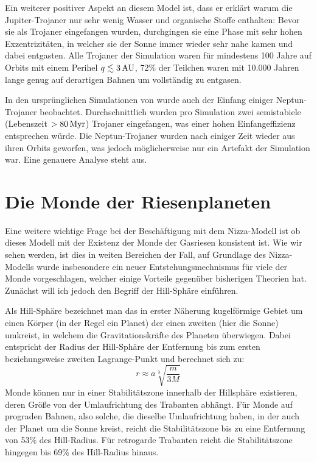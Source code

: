 \documentclass[12pt,a4paper,twoside]{article}
\renewcommand{\cite}{\citep}
\begin{document}
Ein weiterer positiver Aspekt an diesem Model ist, dass er erklärt warum die Jupiter-Trojaner nur sehr wenig Wasser und organische Stoffe enthalten\cite{Emery2004}:
Bevor sie als Trojaner eingefangen wurden, durchgingen sie eine Phase mit sehr hohen Exzentrizitäten, in welcher sie der Sonne immer wieder sehr nahe kamen und dabei entgasten.
Alle Trojaner der Simulation waren für mindestens 100 Jahre auf Orbits mit einem Perihel $q\lesssim \unit[3]{AU}$, 72\% der Teilchen waren mit 10.000 Jahren lange genug auf derartigen Bahnen um vollständig zu entgasen\cite{Levison1997,Morbidelli2005}.

In den ursprünglichen Simulationen von \cite{Tsiganis2005} wurde auch der Einfang einiger Neptun-Trojaner beobachtet. Durchschnittlich wurden pro Simulation zwei semistabiele (Lebenszeit $>\unit[80]{Myr}$) Trojaner eingefangen, was einer hohen Einfangeffizienz entsprechen würde\cite{Tsiganis2005}.
Die Neptun-Trojaner wurden nach einiger Zeit wieder aus ihren Orbits geworfen, was jedoch möglicherweise nur ein Artefakt der Simulation war\cite{Tsiganis2005}. %
Eine genauere Analyse steht aus. %

\FloatBarrier
\section{Die Monde der Riesenplaneten}\label{Monde}
Eine weitere wichtige Frage bei der Beschäftigung mit dem Nizza-Modell ist ob dieses Modell mit der Existenz der Monde der Gasriesen konsistent ist.
Wie wir sehen werden, ist dies in weiten Bereichen der Fall, auf Grundlage des Nizza-Modells wurde insbesondere ein neuer Entstehungsmechnismus für viele der Monde vorgeschlagen, welcher einige Vorteile gegenüber bisherigen Theorien hat. Zunächst will ich jedoch den Begriff der Hill-Sphäre einführen.

Als Hill-Sphäre bezeichnet man das in erster Näherung kugelförmige Gebiet um einen Körper (in der Regel ein Planet) der einen zweiten (hier die Sonne) umkreist, in welchem die Gravitationskräfte des Planeten überwiegen. Dabei entspricht der Radius der Hill-Sphäre der Entfernung bis zum ersten beziehungsweise zweiten Lagrange-Punkt und berechnet sich zu\cite{Sheppard2005}:
\begin{equation} 
r \approx a \sqrt[3]{\frac{m}{3 M}}
\end{equation} %
Monde können nur in einer Stabilitätszone innerhalb der Hillsphäre existieren, deren Größe von der Umlaufrichtung des Trabanten abhängt. Für Monde auf prograden Bahnen, also solche, die dieselbe Umlaufrichtung haben, in der auch der Planet um die Sonne kreist, reicht die Stabilitätszone bis zu eine Entfernung von 53\% des Hill-Radius.
Für retrogarde Trabanten reicht die Stabilitätszone hingegen bis 69\% des Hill-Radius hinaus\cite{Hamilton1997}.
\end{document}
